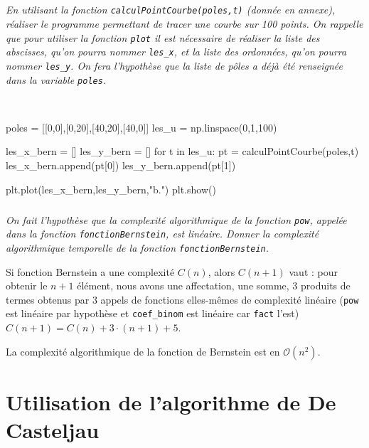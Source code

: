 \documentclass[10pt,fleqn]{article} %
\begin{document}
\subparagraph{}
\textit{En utilisant la fonction \texttt{calculPointCourbe(poles,t)} (donnée en annexe), réaliser le programme permettant de tracer une courbe sur 100 points. 
On rappelle que pour utiliser la fonction \texttt{plot} il est nécessaire de réaliser la liste des abscisses, qu'on pourra nommer \texttt{les\_x}, et la liste des ordonnées, qu'on pourra nommer \texttt{les\_y}. On fera l'hypothèse que la liste de pôles a déjà été renseignée dans la variable \texttt{poles}. }
\ifprof
\begin{corrige}~\\

\begin{py}
\begin{python}
poles = [[0,0],[0,20],[40,20],[40,0]]
les_u = np.linspace(0,1,100)

les_x_bern = []
les_y_bern = []
for t in les_u:
    pt = calculPointCourbe(poles,t)
    les_x_bern.append(pt[0])
    les_y_bern.append(pt[1])

plt.plot(les_x_bern,les_y_bern,"b.")
plt.show()
\end{python}
\end{py}    
\end{corrige}
\else
\fi

\subparagraph{}
\textit{On fait l'hypothèse que la complexité algorithmique de la fonction \texttt{pow}, appelée dans la fonction \texttt{fonctionBernstein}, est linéaire. Donner la complexité algorithmique temporelle de la fonction \texttt{fonctionBernstein}.}

\ifprof
\begin{corrige}
Si fonction Bernstein a une complexité $C(n)$, alors $C(n+1)$ vaut :
pour obtenir le $n+1$ élément, nous avons une affectation, une somme, 3 produits de termes obtenus par 3 appels de fonctions elles-mêmes de complexité linéaire (\texttt{pow} est linéaire par hypothèse et \texttt{coef\_binom} est linéaire car \texttt{fact} l'est) $C(n+1)=C(n)+3\cdot (n+1)+5$.

La complexité algorithmique de la fonction de Bernstein est en $\mathcal{O}\left(n^2\right)$.
\end{corrige}
\else
\fi


\section{Utilisation de l'algorithme de De Casteljau}
\ifprof
\else
\end{document}
